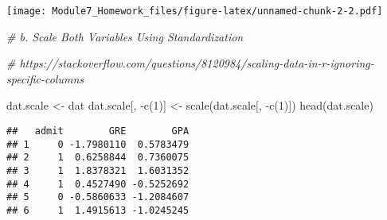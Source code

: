 \documentclass[
]{article}
\newenvironment{Shaded}{\begin{snugshade}}{\end{snugshade}}
\newcommand{\CommentTok}[1]{\textcolor[rgb]{0.56,0.35,0.01}{\textit{#1}}}
\newcommand{\DecValTok}[1]{\textcolor[rgb]{0.00,0.00,0.81}{#1}}
\newcommand{\FunctionTok}[1]{\textcolor[rgb]{0.00,0.00,0.00}{#1}}
\newcommand{\NormalTok}[1]{#1}
\newcommand{\OtherTok}[1]{\textcolor[rgb]{0.56,0.35,0.01}{#1}}
\newcommand{\SpecialCharTok}[1]{\textcolor[rgb]{0.00,0.00,0.00}{#1}}
\begin{document}
\texttt{[image: Module7\_Homework\_files/figure-latex/unnamed-chunk-2-2.pdf]}

\begin{Shaded}
\begin{Highlighting}[]
\CommentTok{\# b. Scale Both Variables Using Standardization}
\end{Highlighting}
\end{Shaded}

\begin{Shaded}
\begin{Highlighting}[]
\CommentTok{\# https://stackoverflow.com/questions/8120984/scaling{-}data{-}in{-}r{-}ignoring{-}specific{-}columns}

\NormalTok{dat.scale }\OtherTok{\textless{}{-}}\NormalTok{ dat}
\NormalTok{dat.scale[, }\SpecialCharTok{{-}}\FunctionTok{c}\NormalTok{(}\DecValTok{1}\NormalTok{)] }\OtherTok{\textless{}{-}} \FunctionTok{scale}\NormalTok{(dat.scale[, }\SpecialCharTok{{-}}\FunctionTok{c}\NormalTok{(}\DecValTok{1}\NormalTok{)])}
\FunctionTok{head}\NormalTok{(dat.scale)}
\end{Highlighting}
\end{Shaded}

\begin{verbatim}
##   admit        GRE        GPA
## 1     0 -1.7980110  0.5783479
## 2     1  0.6258844  0.7360075
## 3     1  1.8378321  1.6031352
## 4     1  0.4527490 -0.5252692
## 5     0 -0.5860633 -1.2084607
## 6     1  1.4915613 -1.0245245
\end{verbatim}

\begin{Shaded}
\end{Shaded}
\end{document}
